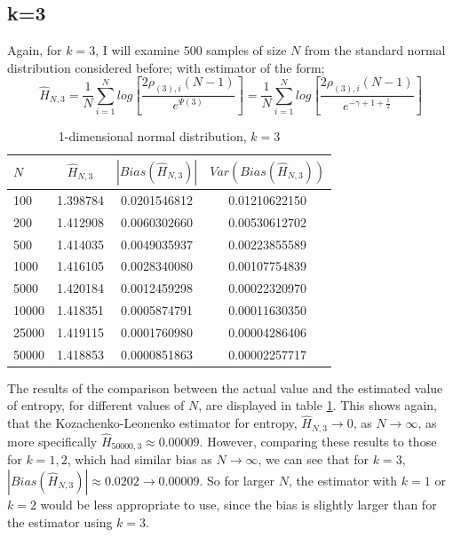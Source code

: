 \documentclass{report}
\begin{document}
\subsection{k=3} \label{N_k=3}
Again, for $k=3$, I will examine $500$ samples of size $N$ from the standard normal distribution considered before; with estimator of the form;
\begin{equation}
\hat{H}_{N, 3} = \frac{1}{N} \sum_{i=1}^{N} log \left[ \frac{2\rho_{(3),i} (N-1)}{e^{\Psi(3)}} \right] = \frac{1}{N} \sum_{i=1}^{N} log \left[ \frac{2\rho_{(3),i} (N-1)}{e^{-\gamma + 1 + \frac{1}{2}}} \right] \nonumber
\end{equation}

\begin{table}
\caption{1-dimensional normal distribution, $k=3$} \label{normal_k=3_table}
\begin{center}
\begin{tabular}{| l | c c c|} 
\toprule
$N$ & $\hat{H}_{N, 3}$ & $|Bias(\hat{H}_{N, 3})|$ & $Var(Bias(\hat{H}_{N, 3}))$ \\
\midrule[1pt]
100     & 1.398784     & 0.0201546812     & 0.01210622150  \\
200     & 1.412908     & 0.0060302660     & 0.00530612702  \\
500     & 1.414035     & 0.0049035937     & 0.00223855589  \\
1000    & 1.416105     & 0.0028340080     & 0.00107754839  \\
5000    & 1.420184     & 0.0012459298     & 0.00022320970  \\
10000   & 1.418351     & 0.0005874791     & 0.00011630350  \\
25000   & 1.419115     & 0.0001760980     & 0.00004286406  \\
50000   & 1.418853     & 0.0000851863     & 0.00002257717  \\
\hline
\end{tabular}
\end{center}
\end{table}

The results of the comparison between the actual value and the estimated value of entropy, for different values of $N$, are displayed in table \ref{normal_k=3_table}. This shows again, that the Kozachenko-Leonenko estimator for entropy, $\hat{H}_{N, 3} \to 0$, as $N \to \infty$, as more specifically $\hat{H}_{50000, 3} \approx 0.00009$. However, comparing these results to those for $k=1, 2$, which had similar bias as $N \to \infty$, we can see that for $k=3$, $|Bias(\hat{H}_{N, 3})| \approx 0.0202 \to 0.00009$. So for larger $N$, the estimator with $k=1$ or $k=2$ would be less appropriate to use, since the bias is slightly larger than for the estimator using $k=3$.
\end{document}
